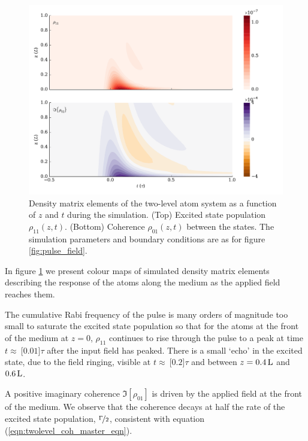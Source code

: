     \begin{figure}
    \includegraphics[width=\linewidth]{figs/02_propagation/mb_two_solve_wp_t01_Ng0100_T0_vel0_D0_fig2.pdf}
    \caption{
      Density matrix elements of the two-level atom system as a function of $z$
      and $t$ during the simulation. (Top) Excited state population
      $\rho_{11}(z,t)$. (Bottom) Coherence $\rho_{01}(z,t)$ between the states.
      The simulation parameters and boundary conditions are as for figure
      \ref{fig:pulse_field}.
    }
    \label{fig:pulse_pop_coh}
    \end{figure}

    In figure \ref{fig:pulse_pop_coh} we present colour maps of simulated
    density matrix elements describing the response of the atoms along the
    medium as the applied field reaches them.

    The cumulative Rabi frequency of the pulse is many orders of magnitude too
    small to saturate the excited state population so that for the atoms at the
    front of the medium at $z\!=\!0$, $\rho_{11}$ continues to rise through the
    pulse to a peak at time $t \approx~$\unit[$0.01$]{$\tau$} after the input
    field has peaked. There is a small `echo' in the excited state, due to the
    field ringing, visible at $t \approx~$\unit[$0.2$]{$\tau$} and between $z =
    \unit[0.4]{L}$ and $\unit[0.6]{L}$.

    A positive imaginary coherence $\Im[{\rho_{01}}]$ is driven by the applied
    field at the front of the medium. We observe that the coherence decays at
    half the rate of the excited state population, $\nicefrac{\Gamma}{2}$,
    consistent with equation (\ref{eqn:twolevel_coh_master_eqn}).

